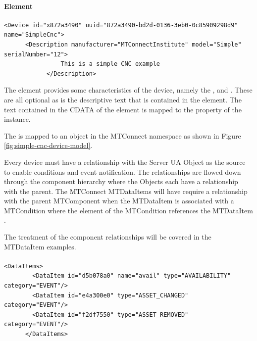 \paragraph{ Element}

\begin{lstlisting}[firstnumber=last,%
    caption={\texttt{Device} Element Mapping},label={lst:device-model-device}]
    <Device id="x872a3490" uuid="872a3490-bd2d-0136-3eb0-0c85909298d9" name="SimpleCnc">
      <Description manufacturer="MTConnectInstitute" model="Simple" serialNumber="12">
				This is a simple CNC example
			</Description>
\end{lstlisting}

The  element provides some characteristics of the device, namely the ,  and . These are all optional as is the descriptive text that is contained in the  element. The text contained in the \gls{CDATA} of the  element is mapped to the  property of the  instance.

The  is mapped to an  object in the MTConnect namespace as shown in Figure \ref{fig:simple-cnc-device-model}.



Every device must have a  relationship with the \gls{Server} UA Object as the source to enable conditions and event notification. The  relationships are flowed down through the component hierarchy where the \glspl{Object} each have a  relationship with the parent. The MTConnect \glspl{MTDataItem} will have require a  relationship with the parent \gls{MTComponent} when the \gls{MTDataItem} is associated with a \gls{MTCondition} where the  element of the \gls{MTCondition} references the \gls{MTDataItem} . 

The treatment of the component relationships will be covered in the \gls{MTDataItem} examples.

\paragraph{ }

\begin{lstlisting}[firstnumber=last,%
    caption={Device Data Items},label={lst:device-data-items}]
      <DataItems>
        <DataItem id="d5b078a0" name="avail" type="AVAILABILITY" category="EVENT"/>
        <DataItem id="e4a300e0" type="ASSET_CHANGED" category="EVENT"/>
        <DataItem id="f2df7550" type="ASSET_REMOVED" category="EVENT"/>
      </DataItems>
\end{lstlisting}

